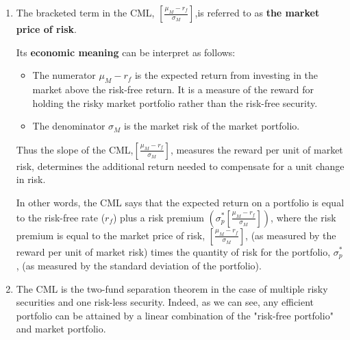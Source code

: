 \documentclass[13pt]{article}
\theoremstyle{definition}
\theoremstyle{remark}
\newenvironment{remark}
  {\pushQED{\qed}\renewcommand{\qedsymbol}{$\triangle$}\remarkx}
  {\popQED\endremarkx}
\begin{document}
\begin{remark}\hfill
\begin{enumerate}
    \item The bracketed term in the CML, $\left[\frac{\mu_{M}-r_{f}}{\sigma_{M}}\right]$,is referred to as \textbf{the market price of risk}.

    Its \textbf{economic meaning} can be interpret as follows: 
    \begin{itemize}
        \item The numerator $\mu_{M}-r_{f}$ is the expected return from investing in the market above the risk-free return. It is a measure of the reward for holding the risky market portfolio rather than the risk-free security.
        \item The denominator $\sigma_{M}$ is the market risk of the market portfolio. 
    \end{itemize} 
    Thus the slope of the CML,$\left[\frac{\mu_{M}-r_{f}}{\sigma_{M}}\right]$, measures the reward per unit of market risk, determines the additional return needed to compensate for a unit change in risk.
    
    {\color{C6}In other words, the CML says that the expected return on a portfolio is equal to the risk-free rate ($r_{f}$) plus a risk premium $\left(\sigma_{p}^*\left[\frac{\mu_{M}-r_{f}}{\sigma_{M}}\right]\right)$, where the risk premium is equal to the market price of risk, $\left[\frac{\mu_{M}-r_{f}}{\sigma_{M}}\right]$, (as measured by the reward per unit of market risk) times the quantity of risk for the portfolio, $\sigma_{p}^*$, (as measured by the standard deviation of the portfolio).}
    \item The CML is the two-fund separation theorem in the case of multiple risky securities and one risk-less security. Indeed, as we can see, any efficient portfolio can be attained by a linear combination of the "risk-free portfolio" and market portfolio.
\end{enumerate}
\end{remark}
\end{document}
